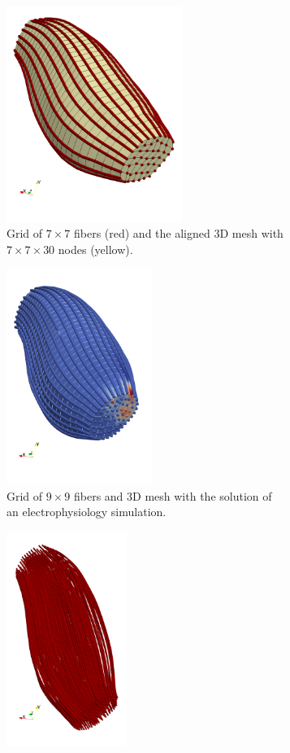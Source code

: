 \begin{figure}%
  \centering%
  \begin{subfigure}[t]{0.30\textwidth}%
    \centering%
    \includegraphics[height=7cm]{images/parallel_fiber_estimation/muscle_mesh.png}
    \caption{Grid of $7 \times 7$ fibers (red) and the aligned 3D mesh with $7 \times 7 \times 30$ nodes (yellow).}%
    \label{fig:muscle_mesh_0}%
  \end{subfigure}
  \quad
  \begin{subfigure}[t]{0.30\textwidth}%
    \centering%
    \includegraphics[height=7cm]{images/parallel_fiber_estimation/muscle_mesh_1b.png}
    \caption{Grid of $9 \times 9$ fibers and 3D mesh with the solution of an electrophysiology simulation.}%
    \label{fig:muscle_mesh_1}%
  \end{subfigure}  
  \quad 
  \begin{subfigure}[t]{0.30\textwidth}%
    \centering%
    \includegraphics[height=7cm]{images/parallel_fiber_estimation/muscle_mesh_2b.png}

\end{subfigure}
\end{figure}
